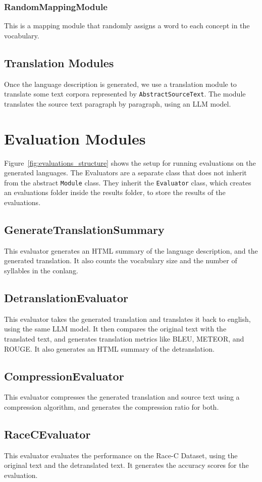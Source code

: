 \subsubsection{RandomMappingModule}
This is a mapping module that randomly assigns a word to each concept in the vocabulary.

\subsection{Translation Modules}
Once the language description is generated, we use a translation module to translate some text corpora represented by \texttt{AbstractSourceText}.
The module translates the source text paragraph by paragraph, using an LLM model.

\section{Evaluation Modules}
Figure~\ref{fig:evaluations_structure} shows the setup for running evaluations on the generated languages. The Evaluators are a separate class 
that does not inherit from the abstract \texttt{Module} class. They inherit the \texttt{Evaluator} class, which creates an evaluations folder 
inside the results folder, to store the results of the evaluations. 

\subsection{GenerateTranslationSummary}
This evaluator generates an HTML summary of the language description, and the generated translation. It also counts the vocabulary size and
the number of syllables in the conlang.
\subsection{DetranslationEvaluator}
This evaluator takes the generated translation and translates it back to english, using the same LLM model. It then compares the original text with the translated text,
and generates translation metrics like BLEU, METEOR, and ROUGE. It also generates an HTML summary of the detranslation.
\subsection{CompressionEvaluator}
This evaluator compresses the generated translation and source text using a compression algorithm, and generates the compression ratio for both.
\subsection{RaceCEvaluator}
This evaluator evaluates the performance on the Race-C Dataset, using the original text and the detranslated text. It generates the accuracy scores for the 
evaluation.
